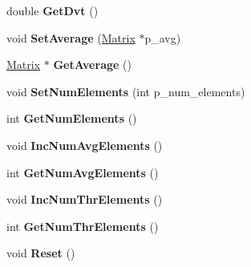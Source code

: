 \begin{DoxyCompactItemize}
\item 
\hypertarget{classEuclideanModel_ad2597398fd70d06c618c1016f405400c}{}double {\bfseries Get\+Dvt} ()\label{classEuclideanModel_ad2597398fd70d06c618c1016f405400c}

\item 
\hypertarget{classEuclideanModel_ae1ca5081ea838fa22a3f3cfa72733314}{}void {\bfseries Set\+Average} (\hyperlink{classMatrix}{Matrix} $\ast$p\+\_\+avg)\label{classEuclideanModel_ae1ca5081ea838fa22a3f3cfa72733314}

\item 
\hypertarget{classEuclideanModel_a66348bde76d72283320e8f9bd5d8c050}{}\hyperlink{classMatrix}{Matrix} $\ast$ {\bfseries Get\+Average} ()\label{classEuclideanModel_a66348bde76d72283320e8f9bd5d8c050}

\item 
\hypertarget{classEuclideanModel_afb865b54e2ec6fddaa7da4779f469d25}{}void {\bfseries Set\+Num\+Elements} (int p\+\_\+num\+\_\+elements)\label{classEuclideanModel_afb865b54e2ec6fddaa7da4779f469d25}

\item 
\hypertarget{classEuclideanModel_a3a548846f3eb38ff60a0883e384f63cb}{}int {\bfseries Get\+Num\+Elements} ()\label{classEuclideanModel_a3a548846f3eb38ff60a0883e384f63cb}

\item 
\hypertarget{classEuclideanModel_a185afd6127fd323ca4e6f9b0761cc1be}{}void {\bfseries Inc\+Num\+Avg\+Elements} ()\label{classEuclideanModel_a185afd6127fd323ca4e6f9b0761cc1be}

\item 
\hypertarget{classEuclideanModel_a292c72827159ab3c47b1a965974fc54f}{}int {\bfseries Get\+Num\+Avg\+Elements} ()\label{classEuclideanModel_a292c72827159ab3c47b1a965974fc54f}

\item 
\hypertarget{classEuclideanModel_ad090ab6a2e2d1a01b6b986d103300f78}{}void {\bfseries Inc\+Num\+Thr\+Elements} ()\label{classEuclideanModel_ad090ab6a2e2d1a01b6b986d103300f78}

\item 
\hypertarget{classEuclideanModel_a6893e6d8a11314d8b3142d5c6d07ba4b}{}int {\bfseries Get\+Num\+Thr\+Elements} ()\label{classEuclideanModel_a6893e6d8a11314d8b3142d5c6d07ba4b}

\item 
\hypertarget{classEuclideanModel_abfdc672a34b5e030be035b046b981d66}{}void {\bfseries Reset} ()\label{classEuclideanModel_abfdc672a34b5e030be035b046b981d66}

\end{DoxyCompactItemize}
